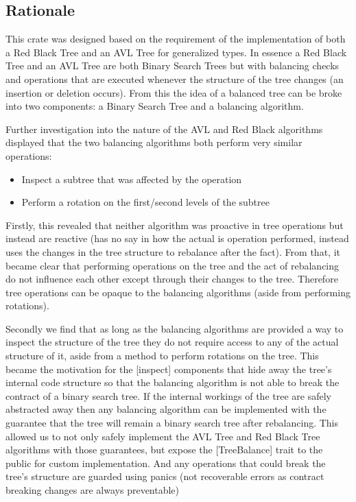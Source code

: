 \documentclass[12pt, letterpaper]{article}
\begin{document}
\subsection{Rationale}

This crate was designed based on the requirement of the implementation of both a Red Black Tree and an AVL Tree
for generalized types.  In essence a Red Black Tree and an AVL Tree are both Binary Search Trees but with balancing checks
and operations that are executed whenever the structure of the tree changes (an insertion or deletion occurs).
From this the idea of a balanced tree can be broke into two components: a Binary Search Tree and a balancing algorithm.

Further investigation into the nature of the AVL and Red Black algorithms displayed that the two balancing algorithms both perform very similar operations:
\begin{itemize}
    \item Inspect a subtree that was affected by the operation
    \item Perform a rotation on the first/second levels of the subtree
\end{itemize}

Firstly, this revealed that neither algorithm was proactive in tree operations but instead are reactive
(has no say in how the actual is operation performed, instead uses the changes in the tree structure to rebalance after the fact).
From that, it became clear that performing operations on the tree and the act of rebalancing do not influence each other except through
their changes to the tree.  Therefore tree operations can be opaque to the balancing algorithms (aside from performing rotations).

Secondly we find that as long as the balancing algorithms are provided a way to inspect the structure of the tree they do not require
access to any of the actual structure of it, aside from a method to perform rotations on the tree.  This became the motivation for
the [inspect] components that hide away the tree's internal code structure so that the balancing algorithm is not able to break
the contract of a binary search tree.  If the internal workings of the tree are safely abstracted away then any balancing algorithm can
be implemented with the guarantee that the tree will remain a binary search tree after rebalancing.  This allowed us to not only safely implement
the AVL Tree and Red Black Tree algorithms with those guarantees, but expose the [TreeBalance] trait to the public for custom implementation.
And any operations that could break the tree's structure are guarded using panics (not recoverable errors as contract breaking changes are always preventable)
\end{document}
